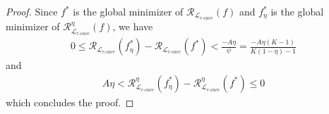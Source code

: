 \documentclass{article}
\begin{document}
\begin{proof}
	Since $f^{*}$ is the global minimizer of $\mathcal{R}_{\mathcal{L}_{r\text{-}cace}}(f)$ and $f^{*}_{\eta}$  is the global minimizer of $\mathcal{R}^{\eta}_{\mathcal{L}_{r\text{-}cace}}(f)$, we have 
	\begin{align}
		0\le \mathcal{R}_{\mathcal{L}_{r\textrm{-}cace}}(f^{*}_{\eta}) - \mathcal{R}_{\mathcal{L}_{r\textrm{-}cace}}(f^{*}) \nonumber < \frac{-A\eta}{\psi}
		=\frac{-A\eta (K-1)}{K(1-\eta)-1} \nonumber
	\end{align}
	and 
	\begin{align}
		A\eta<\mathcal{R}^{\eta}_{\mathcal{L}_{r\textrm{-}cace}}(f^{*}_{\eta}) - \mathcal{R}^{\eta}_{\mathcal{L}_{r\textrm{-}cace}}(f^{*}) \le 0 \nonumber
	\end{align}
	which concludes the proof.
\end{proof}
\end{document}
